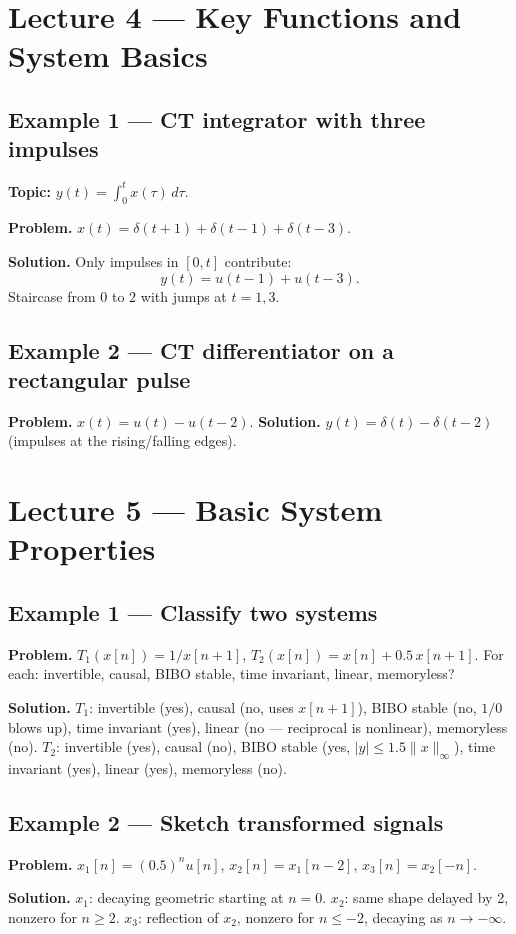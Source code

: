 \documentclass[11pt]{article}
\begin{document}
\section{Lecture 4 --- Key Functions and System Basics}

\subsection{Example 1 --- CT integrator with three impulses}
\textbf{Topic:} $y(t)=\int_0^t x(\tau)\,d\tau$.

\textbf{Problem.} $x(t)=\delta(t+1)+\delta(t-1)+\delta(t-3)$.

\textbf{Solution.} Only impulses in $[0,t]$ contribute:
\[y(t)=u(t-1)+u(t-3).\]
Staircase from $0$ to $2$ with jumps at $t=1,3$.

\subsection{Example 2 --- CT differentiator on a rectangular pulse}
\textbf{Problem.} $x(t)=u(t)-u(t-2)$.
\textbf{Solution.} $y(t)=\delta(t)-\delta(t-2)$ (impulses at the rising/falling edges).

\section{Lecture 5 --- Basic System Properties}

\subsection{Example 1 --- Classify two systems}
\textbf{Problem.} $T_1(x[n])=1/x[n+1]$, $T_2(x[n])=x[n]+0.5\,x[n+1]$. For each: invertible, causal, BIBO stable, time invariant, linear, memoryless?

\textbf{Solution.} $T_1$: invertible (yes), causal (no, uses $x[n+1]$), BIBO stable (no, $1/0$ blows up), time invariant (yes), linear (no --- reciprocal is nonlinear), memoryless (no).
$T_2$: invertible (yes), causal (no), BIBO stable (yes, $|y|\le 1.5\|x\|_\infty$), time invariant (yes), linear (yes), memoryless (no).

\subsection{Example 2 --- Sketch transformed signals}
\textbf{Problem.} $x_1[n]=(0.5)^n u[n]$, $x_2[n]=x_1[n-2]$, $x_3[n]=x_2[-n]$.

\textbf{Solution.} $x_1$: decaying geometric starting at $n=0$. $x_2$: same shape delayed by 2, nonzero for $n\ge 2$. $x_3$: reflection of $x_2$, nonzero for $n\le -2$, decaying as $n\to-\infty$.
\end{document}
